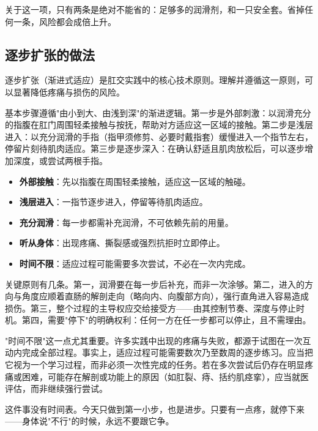 \documentclass[12pt,UTF8]{ctexbook}
\newcommand{\keyword}[1]{\textbf{#1}}
\begin{document}
\begin{tcolorbox}[colback=pink!5!white,colframe=red!50!black,title=贴心小叮咛]
	关于这一项，只有两条是绝对不能省的：足够多的润滑剂，和一只安全套。省掉任何一条，风险都会成倍上升。
\end{tcolorbox}
\subsection{逐步扩张的做法}

逐步扩张（渐进式适应）是肛交实践中的核心技术原则。理解并遵循这一原则，可以显著降低疼痛与损伤的风险。

基本步骤遵循"由小到大、由浅到深"的渐进逻辑。第一步是外部刺激：以润滑充分的指腹在肛门周围轻柔接触与按抚，帮助对方适应这一区域的接触。第二步是浅层进入：以充分润滑的手指（指甲须修剪、必要时戴指套）缓慢进入一个指节左右，停留片刻待肌肉适应。第三步是逐步深入：在确认舒适且肌肉放松后，可以逐步增加深度，或尝试两根手指。

\begin{itemize}
	\item \keyword{外部接触}：先以指腹在周围轻柔接触，适应这一区域的触碰。
	\item \keyword{浅层进入}：一指节逐步进入，停留等待肌肉适应。
	\item \keyword{充分润滑}：每一步都需补充润滑，不可依赖先前的用量。
	\item \keyword{听从身体}：出现疼痛、撕裂感或强烈抗拒时立即停止。
	\item \keyword{时间不限}：适应过程可能需要多次尝试，不必在一次内完成。
\end{itemize}

关键原则有几条。第一，润滑要在每一步后补充，而非一次涂够。第二，进入的方向与角度应顺着直肠的解剖走向（略向内、向腹部方向），强行直角进入容易造成损伤。第三，整个过程的主导权应交给接受方——由其控制节奏、深度与停止时机。第四，需要"停下"的明确权利：任何一方在任一步都可以停止，且不需理由。

"时间不限"这一点尤其重要。许多实践中出现的疼痛与失败，都源于试图在一次互动内完成全部过程。事实上，适应过程可能需要数次乃至数周的逐步练习。应当把它视为一个学习过程，而非必须一次性完成的任务。若在多次尝试后仍存在明显疼痛或困难，可能存在解剖或功能上的原因（如肛裂、痔、括约肌痉挛），应当就医评估，而非继续强行尝试。

\begin{tcolorbox}[colback=pink!5!white,colframe=red!50!black,title=贴心小叮咛]
	这件事没有时间表。今天只做到第一小步，也是进步。只要有一点疼，就停下来——身体说"不行"的时候，永远不要跟它争。
\end{tcolorbox}
\end{document}
